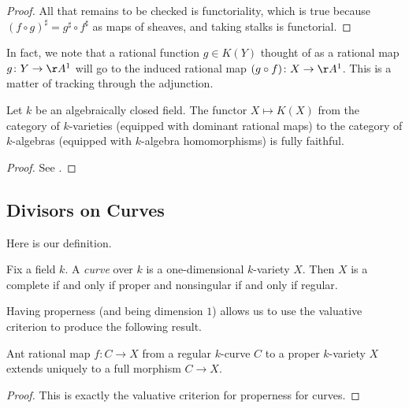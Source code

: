 \documentclass[../notes.tex]{subfiles}
\begin{document}
\begin{proof}
	All that remains to be checked is functoriality, which is true because $(f\circ g)^\sharp=g^\sharp\circ f^\sharp$ as maps of sheaves, and taking stalks is functorial.
\end{proof}
\begin{remark}
	In fact, we note that a rational function $g\in K(Y)$ thought of as a rational map $g\colon Y\to\AA^1$ will go to the induced rational map $(g\circ f)\colon X\to\AA^1$. This is a matter of tracking through the adjunction.
\end{remark}
\begin{theorem}
	Let $k$ be an algebraically closed field. The functor $X\mapsto K(X)$  from the category of $k$-varieties (equipped with dominant rational maps) to the category of $k$-algebras (equipped with $k$-algebra homomorphisms) is fully faithful.
\end{theorem}
\begin{proof}
	See \cite[Theorem~I.4.4]{hartshorne}.
\end{proof}

\subsection{Divisors on Curves}
Here is our definition.
\begin{definition}[curve]
	Fix a field $k$. A \textit{curve} over $k$ is a one-dimensional $k$-variety $X$. Then $X$ is a complete if and only if proper and nonsingular if and only if regular.
\end{definition}
Having properness (and being dimension $1$) allows us to use the valuative criterion to produce the following result.
\begin{proposition}
	Ant rational map $f\colon C\to X$ from a regular $k$-curve $C$ to a proper $k$-variety $X$ extends uniquely to a full morphism $C\to X$.
\end{proposition}
\begin{proof}
	This is exactly the valuative criterion for properness for curves.
\end{proof}
\end{document}
